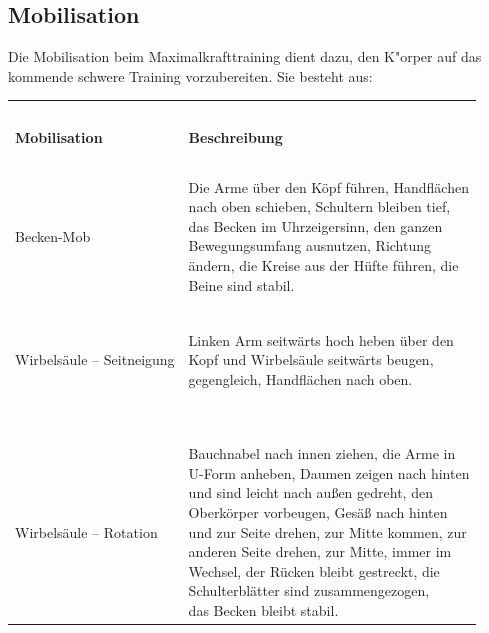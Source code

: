 \documentclass[FIPLY_base.tex]{subfiles}
\begin{document}
	\subsection{Mobilisation}
	Die Mobilisation beim Maximalkrafttraining dient dazu, den K"orper auf das kommende schwere Training vorzubereiten. 
	Sie besteht aus:
			\begin{center}
				\begin{tabular}{ p{5cm} | p{8cm} }
					\hline
					\ \\
					\textbf{Mobilisation} & \textbf{Beschreibung}     
					\\ \hline \hline
					\ \\ 
					Becken-Mob & \pbox{10cm}{Die Arme über den Köpf führen, Handflächen \newline nach oben schieben, Schultern bleiben tief, \newline das Becken im Uhrzeigersinn, den ganzen \newline Bewegungsumfang ausnutzen, Richtung \newline ändern, die Kreise aus der Hüfte führen, die \newline Beine sind stabil.}
					\ \\ 
					\\ \hline
					\ \\
					Wirbelsäule – Seitneigung & \pbox{10cm}{Linken Arm seitwärts hoch heben über den \newline Kopf und Wirbelsäule seitwärts beugen, \newline gegengleich, Handflächen nach oben.}
					\ \\ 
					\ \\
					\hline
					\ \\
					Wirbelsäule – Rotation & \pbox{10cm}{Bauchnabel nach innen ziehen, die Arme in \newline U-Form anheben, Daumen zeigen nach hinten \newline und sind leicht nach außen gedreht, den \newline Oberkörper vorbeugen, Gesäß nach hinten \newline und zur Seite drehen, zur Mitte kommen, zur \newline anderen Seite drehen, zur Mitte, immer im \newline Wechsel, der Rücken bleibt gestreckt, die \newline Schulterblätter sind zusammengezogen, \newline das Becken bleibt stabil.}
					\ \\ 

\end{tabular}
\end{center}
\end{document}
